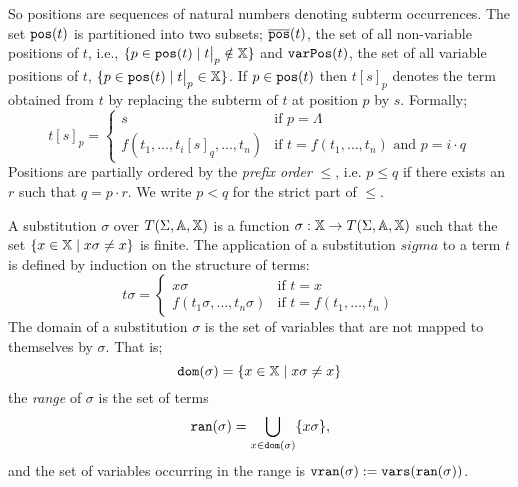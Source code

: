 So positions are sequences of natural numbers denoting subterm occurrences. The set $\mathtt{pos}(t)$ is partitioned into two subsets; $\overline{\mathtt{pos}}(t)$, the set of all non-variable positions of $t$, i.e., $\{p \in \pos{t} \mid \restr{t}{p} \notin \var \}$ and $\mathtt{varPos}(t)$, the set of all variable positions of $t$, $\{p \in \pos{t} \mid \restr{t}{p} \in \var \}$. If $p \in \mathtt{pos}(t)$ then $t[s]_p$ denotes the term obtained from $t$ by replacing the subterm of $t$ at position $p$ by $s$. Formally;
\begin{displaymath}
    t[s]_p =
	\begin{cases}
		s                & \mbox{if } p = \Lambda                               \\
		f(t_1, \dots, t_i[s]_q, \dots, t_n) & \mbox{if } t = f(t_1, \dots, t_n) \mbox{ and } p = i \cdot q
	\end{cases}
\end{displaymath}
Positions are partially ordered by the \textit{prefix order} $\leq$, i.e. $p \leq q$ if there exists an $r$ such that $q = p \cdot r$. We write $p < q$ for the strict part of $\leq$.

A substitution $\sigma$ over $T(\Sigma,\mathbb{A},\mathbb{X})$ is a function $\sigma : \mathbb{X} \to T(\Sigma,\mathbb{A},\mathbb{X})$ such that the set $\{ x \in \mathbb{X} \mid x \sigma \neq x \}$ is finite. The application of a substitution $sigma$ to a term $t$ is defined by induction on the structure of terms:
\begin{displaymath}
    t\sigma =
	\begin{cases}
		x\sigma                & \mbox{if } t = x                               \\
		f(t_1\sigma, \dots, t_n\sigma) & \mbox{if } t = f(t_1, \dots, t_n)
	\end{cases}
\end{displaymath}
The domain of a substitution $\sigma$ is the set of variables that are not mapped to themselves by $\sigma$. That is;
$$ \mathtt{dom}(\sigma) = \{x \in \mathbb{X} \mid x \sigma \neq x\}$$
the \textit{range} of $\sigma$ is the set of terms
$$ \mathtt{ran}(\sigma) = \bigcup\limits_{x \in \mathtt{dom}(\sigma)}  \{ x\sigma \},$$
and the set of variables occurring in the range is $\mathtt{v}\mathtt{ran}(\sigma) := \mathtt{vars}(\mathtt{ran}(\sigma))$.

